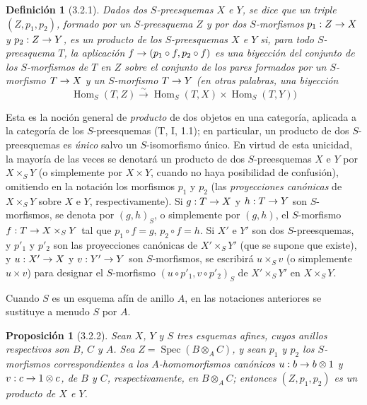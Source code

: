 \documentclass[oneside]{amsart}
\theoremstyle{ega-env-style}
\theoremstyle{ega-thm-env-style}
\newtheorem*{proposition}{Proposición}
\theoremstyle{ega-defn-env-style}
\newtheorem*{definition}{Definición}
\renewcommand{\to}{\mathchoice{\longrightarrow}{\rightarrow}{\rightarrow}{\rightarrow}}
\newcommand{\oldpage}[2][]{{\marginnote{\normalfont{\textbf{#1}~|~#2}}}\ignorespaces}
\let\EGAOriginalLabel\label
\renewcommand{\label}[1]{\phantomsection\EGAOriginalLabel{#1}}
\begin{document}
\begin{definition}[3.2.1]
\label{I.3.2.1}
Dados dos $S$-preesquemas $X$ e $Y$, se dice que un triple $(Z,p_1,p_2)$, formado por un
$S$-preesquema $Z$ y por dos $S$-morfismos $p_1:Z\to X$ y $p_2:Z\to Y$, es un producto de los
\oldpage[I]{105}
$S$-preesquemas $X$ e $Y$ si, para todo $S$-preesquema $T$, la aplicación
$f\to(p_1\circ f,p_2\circ f)$ es una biyección del conjunto de los $S$-morfismos de $T$ en
$Z$ sobre el conjunto de los pares formados por un $S$-morfismo $T\to X$ y un $S$-morfismo $T\to Y$
\textup{(en otras palabras, una biyección}
\[
  \operatorname{Hom}_S(T,Z)\xrightarrow{\sim}
  \operatorname{Hom}_S(T,X)\times\operatorname{Hom}_S(T,Y))
\]
\end{definition}

Esta es la noción general de \emph{producto} de dos objetos en una categoría, aplicada
a la categoría de los $S$-preesquemas (T, I, 1.1); en particular, un producto de dos $S$-preesquemas
es \emph{único} salvo un $S$-isomorfismo único. En virtud de esta unicidad, la mayoría de las veces
se denotará un producto de dos $S$-preesquemas $X$ e $Y$ por $X\times_S Y$ (o
simplemente por $X\times Y$, cuando no haya posibilidad de confusión), omitiendo en la notación los morfismos $p_1$ y $p_2$
(las \emph{proyecciones canónicas} de $X\times_S Y$ sobre $X$ e $Y$, respectivamente).
Si $g:T\to X$ y $h:T\to Y$ son $S$-morfismos, se denota por $(g,h)_S$, o
simplemente por $(g,h)$, el $S$-morfismo $f:T\to X\times_S Y$ tal que $p_1\circ f=g$,
$p_2\circ f=h$. Si $X'$ e $Y'$ son dos $S$-preesquemas, y $p'_1$ y $p'_2$ son las proyecciones canónicas
de $X'\times_S Y'$ (que se supone que existe), y $u:X'\to X$ y
$v:Y'\to Y$ son $S$-morfismos, se escribirá $u\times_S v$ (o simplemente $u\times v$)
para designar el $S$-morfismo $(u\circ p'_1,v\circ p'_2)_S$ de $X'\times_S Y'$ en
$X\times_S Y$.

Cuando $S$ es un esquema afín de anillo $A$, en las notaciones anteriores se sustituye a menudo $S$
por $A$.

\begin{proposition}[3.2.2]
\label{I.3.2.2}
Sean $X$, $Y$ y $S$ tres esquemas afines, cuyos anillos respectivos son $B$, $C$ y $A$. Sea
$Z=\operatorname{Spec}(B\otimes_A C)$, y sean $p_1$ y $p_2$ los $S$-morfismos correspondientes  a
los $A$-homomorfismos canónicos $u:b\to b\otimes1$ y $v:c\to1\otimes c$, de $B$
y $C$, respectivamente, en $B\otimes_A C$; entonces $(Z,p_1,p_2)$ es un producto de $X$ e $Y$.
\end{proposition}
\end{document}
